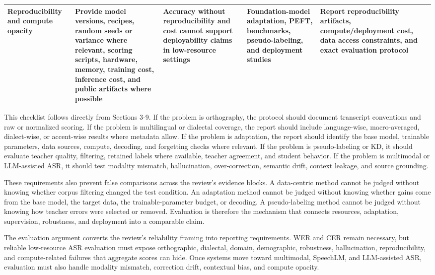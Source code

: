\documentclass[pdflatex,sn-basic,iicol]{sn-jnl}
\theoremstyle{thmstyleone}
\theoremstyle{thmstyletwo}
\theoremstyle{thmstylethree}
\begin{document}
\begin{table}[htbp]
\begin{tabularx}{\textwidth}{YYYYYY}
Reproducibility and compute opacity & Provide model versions, recipes, random seeds or variance where relevant, scoring scripts, hardware, memory, training cost, inference cost, and public artifacts where possible & Accuracy without reproducibility and cost cannot support deployability claims in low-resource settings & Foundation-model adaptation, PEFT, benchmarks, pseudo-labeling, and deployment studies & Report reproducibility artifacts, compute/deployment cost, data access constraints, and exact evaluation protocol & \citep{yang2021superb,watanabe2018espnet,ravanelli2021speechbrain,feng2022superbslt} \\
\bottomrule
\end{tabularx}
\end{table}

This checklist follows directly from Sections 3-9. If the problem is orthography, the protocol should document transcript conventions and raw or normalized scoring. If the problem is multilingual or dialectal coverage, the report should include language-wise, macro-averaged, dialect-wise, or accent-wise results where metadata allow. If the problem is adaptation, the report should identify the base model, trainable parameters, data sources, compute, decoding, and forgetting checks where relevant. If the problem is pseudo-labeling or KD, it should evaluate teacher quality, filtering, retained labels where available, teacher agreement, and student behavior. If the problem is multimodal or LLM-assisted ASR, it should test modality mismatch, hallucination, over-correction, semantic drift, context leakage, and source grounding.

These requirements also prevent false comparisons across the review's evidence blocks. A data-centric method cannot be judged without knowing whether corpus filtering changed the test condition. An adaptation method cannot be judged without knowing whether gains come from the base model, the target data, the trainable-parameter budget, or decoding. A pseudo-labeling method cannot be judged without knowing how teacher errors were selected or removed. Evaluation is therefore the mechanism that connects resources, adaptation, supervision, robustness, and deployment into a comparable claim.

The evaluation argument converts the review's reliability framing into reporting requirements. WER and CER remain necessary, but reliable low-resource ASR evaluation must expose orthographic, dialectal, domain, demographic, robustness, hallucination, reproducibility, and compute-related failures that aggregate scores can hide. Once systems move toward multimodal, SpeechLM, and LLM-assisted ASR, evaluation must also handle modality mismatch, correction drift, contextual bias, and compute opacity.
\end{document}
